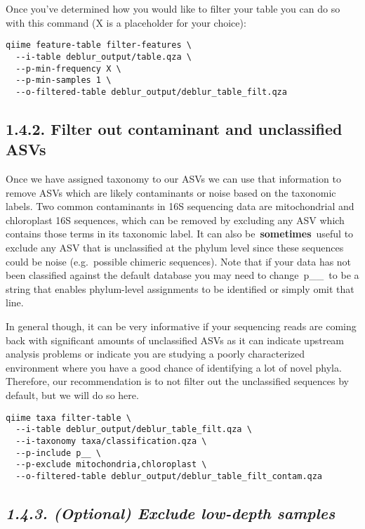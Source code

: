 \documentclass[
]{book}
\begin{document}
Once you've determined how you would like to filter your table you can do so with this command (X is a placeholder for your choice):

\begin{verbatim}
qiime feature-table filter-features \
  --i-table deblur_output/table.qza \
  --p-min-frequency X \
  --p-min-samples 1 \
  --o-filtered-table deblur_output/deblur_table_filt.qza
\end{verbatim}

\subsection{1.4.2. Filter out contaminant and unclassified ASVs}\label{filter-out-contaminant-and-unclassified-asvs}

Once we have assigned taxonomy to our ASVs we can use that information to remove ASVs which are likely contaminants or noise based on the taxonomic labels. Two common contaminants in 16S sequencing data are mitochondrial and chloroplast 16S sequences, which can be removed by excluding any ASV which contains those terms in its taxonomic label. It can also be~\textbf{sometimes}~useful to exclude any ASV that is unclassified at the phylum level since these sequences could be noise (e.g.~possible chimeric sequences). Note that if your data has not been classified against the default database you may need to change~p\_\_~to be a string that enables phylum-level assignments to be identified or simply omit that line.

In general though, it can be very informative if your sequencing reads are coming back with significant amounts of unclassified ASVs as it can indicate upstream analysis problems or indicate you are studying a poorly characterized environment where you have a good chance of identifying a lot of novel phyla. Therefore, our recommendation is to not filter out the unclassified sequences by default, but we will do so here.

\begin{verbatim}
qiime taxa filter-table \
  --i-table deblur_output/deblur_table_filt.qza \
  --i-taxonomy taxa/classification.qza \
  --p-include p__ \
  --p-exclude mitochondria,chloroplast \
  --o-filtered-table deblur_output/deblur_table_filt_contam.qza
\end{verbatim}

\subsection{\texorpdfstring{\emph{1.4.3. (Optional) Exclude low-depth samples}}{1.4.3. (Optional) Exclude low-depth samples}}\label{optional-exclude-low-depth-samples}
\end{document}
